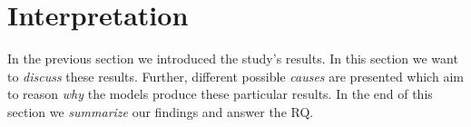 \section{Interpretation}
\label{chp:study:sec:interpretation}
In the previous section we introduced the study's results.
In this section we want to \textit{discuss} these results.
Further, different possible \textit{causes} are presented which aim to reason \textit{why} the models produce these particular results.
In the end of this section we \textit{summarize} our findings and answer the \ac{RQ}.




